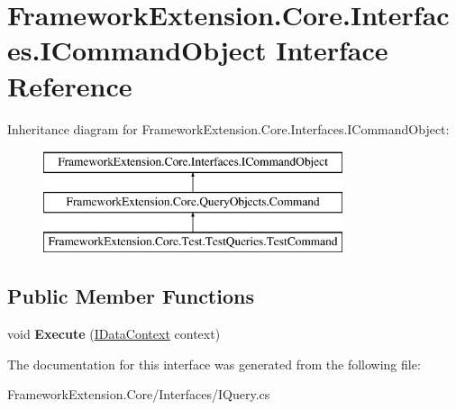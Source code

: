 \hypertarget{interface_framework_extension_1_1_core_1_1_interfaces_1_1_i_command_object}{\section{Framework\-Extension.\-Core.\-Interfaces.\-I\-Command\-Object Interface Reference}
\label{interface_framework_extension_1_1_core_1_1_interfaces_1_1_i_command_object}
}
Inheritance diagram for Framework\-Extension.\-Core.\-Interfaces.\-I\-Command\-Object\-:\begin{figure}[H]
\begin{center}
\leavevmode
\includegraphics[height=3.000000cm]{interface_framework_extension_1_1_core_1_1_interfaces_1_1_i_command_object}
\end{center}
\end{figure}
\subsection*{Public Member Functions}
\begin{DoxyCompactItemize}
\item 
\hypertarget{interface_framework_extension_1_1_core_1_1_interfaces_1_1_i_command_object_a4e41bd2594aa5c7902bb03cd0bd002bc}{void {\bfseries Execute} (\hyperlink{interface_framework_extension_1_1_core_1_1_interfaces_1_1_i_data_context}{I\-Data\-Context} context)}\label{interface_framework_extension_1_1_core_1_1_interfaces_1_1_i_command_object_a4e41bd2594aa5c7902bb03cd0bd002bc}

\end{DoxyCompactItemize}


The documentation for this interface was generated from the following file\-:\begin{DoxyCompactItemize}
\item 
Framework\-Extension.\-Core/\-Interfaces/I\-Query.\-cs\end{DoxyCompactItemize}
